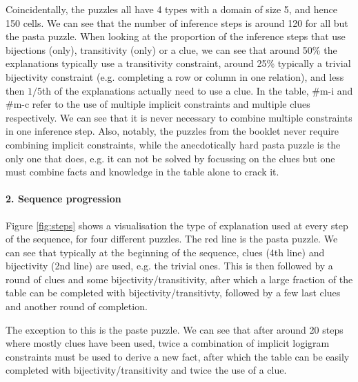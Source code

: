 Coincidentally, the puzzles all have 4 types with a domain of size 5, and hence 150 cells. We can see that the number of inference steps is around 120 for all but the pasta puzzle. When looking at the proportion of the inference steps that use bijections (only), transitivity (only) or a clue, we can see that around 50\% the explanations typically use a transitivity constraint, around 25\% typically a trivial bijectivity constraint (e.g. completing a row or column in one relation), and less then $1/5$th of the explanations actually need to use a clue.
In the table, \#m-i and \#m-c refer to the use of multiple implicit constraints and multiple clues respectively. We can see that it is never necessary to combine multiple constraints in one inference step. Also, notably, the puzzles from the booklet never require combining implicit constraints, while the anecdotically hard pasta puzzle is the only one that does, e.g. it can not be solved by focussing on the clues but one must combine facts and knowledge in the table alone to crack it.



\paragraph{2. Sequence progression}
Figure \ref{fig:steps} shows a visualisation the type of explanation used at every step of the sequence, for four different puzzles. The red line is the pasta puzzle. We can see that typically at the beginning of the sequence, clues (4th line) and bijectivity (2nd line) are used, e.g. the trivial ones. This is then followed by a round of clues and some bijectivity/transitivity, after which a large fraction of the table can be completed with bijectivity/transitivty, followed by a few last clues and another round of completion.

The exception to this is the paste puzzle. We can see that after around 20 steps where mostly clues have been used, twice a combination of implicit logigram constraints must be used to derive a new fact, after which the table can be easily completed with bijectivity/transitivity and twice the use of a clue.

